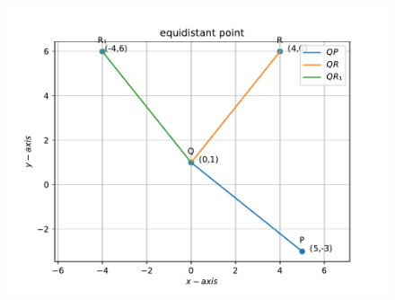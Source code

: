 \documentclass[12pt]{article}
\begin{document}
\begin{enumerate}
\begin{figure}[!h]
 \begin{center}
  \includegraphics[width=\columnwidth]{figs/fig.pdf}
 \end{center}
\caption{}
\label{fig:Fig1}
\end{figure}



\end{enumerate}
\end{document}
